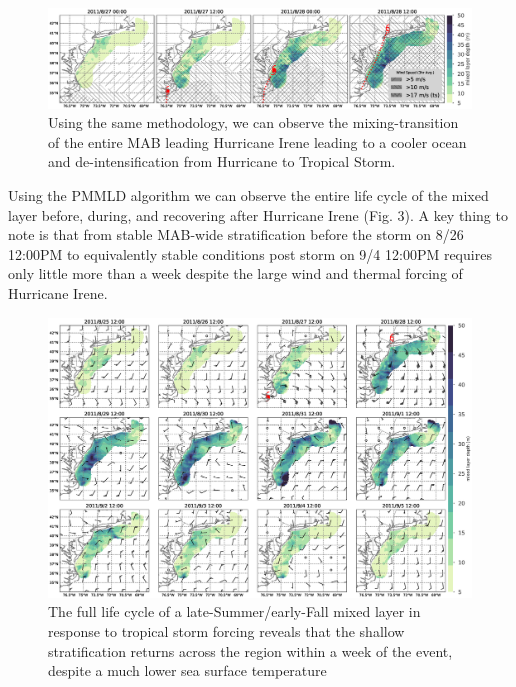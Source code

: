 \documentclass{article}
\begin{document}
\begin{figure}[h]
\caption{Using the same methodology, we can observe the mixing-transition of the entire MAB leading Hurricane Irene leading to a cooler ocean and de-intensification from Hurricane to Tropical Storm.}
\centering
\includegraphics[width=1.0\textwidth, keepaspectratio]{irene_4panel.eps}
\end{figure}


Using the PMMLD algorithm we can observe the entire life cycle of the mixed layer before, during, and recovering after Hurricane Irene (Fig. 3). 
A key thing to note is that from stable MAB-wide stratification before the storm on 8/26 12:00PM to equivalently stable conditions post storm on 9/4 12:00PM requires only little more than a week despite the large wind and thermal forcing of Hurricane Irene.
\begin{figure}[h]
\caption{The full life cycle of a late-Summer/early-Fall mixed layer in response to tropical storm forcing reveals that the shallow stratification returns across the region within a week of the event, despite a much lower sea surface temperature}
\centering
\includegraphics[width=1.0\textwidth, keepaspectratio]{irene_barbs_4koma.eps}
\end{figure}
\end{document}
